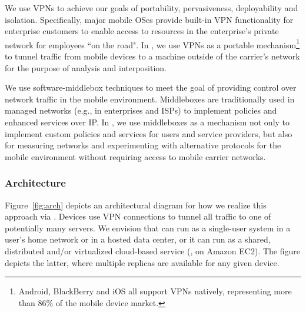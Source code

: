 We use VPNs to achieve our goals of portability, pervasiveness, deployability 
and isolation. Specifically, major
 mobile OSes provide built-in VPN functionality for enterprise
 customers to enable access to resources in
 the enterprise's private network for employees ``on the road". 
In \meddle, we use VPNs as a portable mechanism\footnote{Android, BlackBerry and iOS all support VPNs natively, representing more than 86\% of the mobile device market\cite{gartner-phone-share}.} to tunnel traffic from mobile devices to a machine outside of the carrier's network for the purpose of analysis and interposition. 

We use software-middlebox techniques to meet the goal of providing control over network traffic in the mobile 
environment. Middleboxes are traditionally used in managed networks (e.g., in enterprises and ISPs) to implement policies and enhanced services over IP. In \meddle, we use middleboxes as a mechanism not only to implement custom policies and services for users and service providers, but also for measuring networks and experimenting with alternative protocols for the mobile environment without requiring access to mobile carrier networks. 


\subsubsection{Architecture}
Figure~\ref{fig:arch} depicts an architectural diagram for how we realize this 
approach via \meddle. Devices use VPN connections to tunnel all 
traffic to one of potentially many \meddle servers. We envision that \meddle 
can run as a single-user system in a user's home network or in a hosted data center, 
or it can run as a shared, distributed and/or virtualized cloud-based service (\eg, on 
Amazon EC2). The 
figure depicts the latter, where multiple \meddle replicas are available for any 
given device. 

